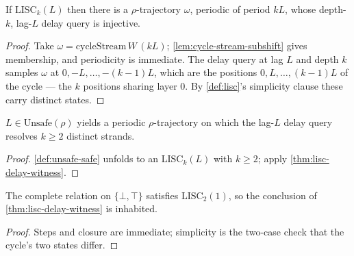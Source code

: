 \begin{theorem}
  \label{thm:lisc-delay-witness}
  \leanok
  If $\mathrm{LISC}_k(L)$ then there is a $\rho$-trajectory $\omega$, periodic
  of period $kL$, whose depth-$k$, lag-$L$ delay query is injective.
\end{theorem}

\begin{proof}
  \leanok
  Take $\omega = \mathrm{cycleStream}\,W\,(kL)$; \ref{lem:cycle-stream-subshift}
  gives membership, and periodicity is immediate. The delay query at lag $L$ and
  depth $k$ samples $\omega$ at $0, -L, \dots, -(k-1)L$, which are the positions
  $0, L, \dots, (k-1)L$ of the cycle --- the $k$ positions sharing layer $0$. By
  \ref{def:lisc}'s simplicity clause these carry distinct states.
\end{proof}

\begin{corollary}
  \label{cor:unsafe-delay}
  \leanok
  $L \in \mathrm{Unsafe}(\rho)$ yields a periodic $\rho$-trajectory on which
  the lag-$L$ delay query resolves $k \geq 2$ distinct strands.
\end{corollary}

\begin{proof}
  \leanok
  \ref{def:unsafe-safe} unfolds to an $\mathrm{LISC}_k(L)$ with $k \geq 2$;
  apply \ref{thm:lisc-delay-witness}.
\end{proof}

\begin{lemma}
  \label{lem:lisc-inhabited}
  \leanok
  The complete relation on $\{\bot,\top\}$ satisfies $\mathrm{LISC}_2(1)$, so
  the conclusion of \ref{thm:lisc-delay-witness} is inhabited.
\end{lemma}

\begin{proof}
  \leanok
  Steps and closure are immediate; simplicity is the two-case check that the
  cycle's two states differ.
\end{proof}

